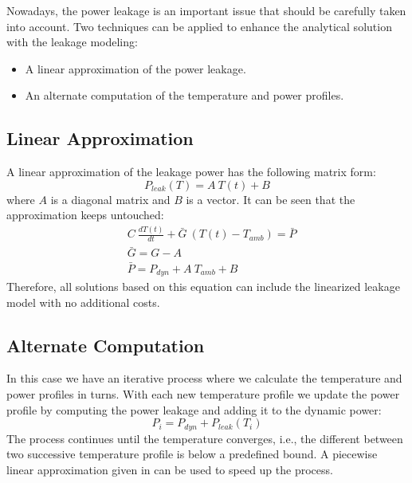   Nowadays, the power leakage is an important issue that should be carefully taken into account. Two techniques can be applied to enhance the analytical solution with the leakage modeling:
  \begin{itemize}
    \item A linear approximation of the power leakage.
    \item An alternate computation of the temperature and power profiles.
  \end{itemize}

\subsection{Linear Approximation}
A linear approximation of the leakage power has the following matrix form:
\[
  P_{leak}(T) = A \: T(t) + B
\]
where $A$ is a diagonal matrix and $B$ is a vector. It can be seen that the approximation keeps  untouched:
\begin{align*}
  & C \: \frac{dT(t)}{dt} + \bar{G} \: (T(t) - T_{amb}) = \bar{P} \\
  & \bar{G} = G - A \\
  & \bar{P} = P_{dyn} + A \: T_{amb} + B
\end{align*}
Therefore, all solutions based on this equation can include the linearized leakage model with no additional costs.

\subsection{Alternate Computation}
In this case we have an iterative process where we calculate the temperature and power profiles in turns. With each new temperature profile we update the power profile by computing the power leakage and adding it to the dynamic power:
\[
  P_i = P_{dyn} + P_{leak}(T_i)
\]
The process continues until the temperature converges, i.e., the different between two successive temperature profile is below a predefined bound. A piecewise linear approximation given in \cite{liu2007} can be used to speed up the process.
